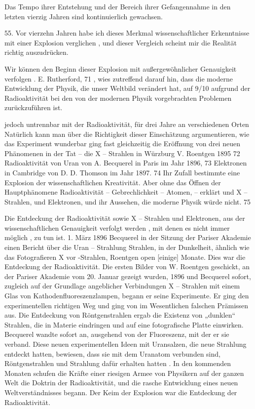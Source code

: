\documentclass[11pt,a4paper]{book}
\begin{document}
Das Tempo ihrer Entstehung und der Bereich ihrer Gefangennahme in den letzten vierzig Jahren sind kontinuierlich gewachsen.



55. Vor vierzehn Jahren habe ich dieses Merkmal wissenschaftlicher Erkenntnisse mit einer Explosion verglichen , und dieser Vergleich scheint mir die Realität richtig auszudrücken.



Wir können den Beginn dieser Explosion mit außergewöhnlicher Genauigkeit verfolgen . E. Rutherford, 71 , wies zutreffend darauf hin, dass die moderne Entwicklung der Physik, die unser Weltbild verändert hat, auf 9/10 aufgrund der Radioaktivität bei den von der modernen Physik vorgebrachten Problemen zurückzuführen ist.



jedoch untrennbar mit der Radioaktivität, für drei Jahre an verschiedenen Orten Natürlich kann man über die Richtigkeit dieser Einschätzung argumentieren, wie das Experiment wunderbar ging fast gleichzeitig die Eröffnung von drei neuen Phänomenen in der Tat -- die X -- Strahlen in Würzburg V. Roentgen 1895 72 Radioaktivität von Uran von A. Becquerel in Paris im Jahr 1896, 73 Elektronen in Cambridge von D. D. Thomson im Jahr 1897. 74 Ihr Zufall bestimmte eine Explosion der wissenschaftlichen Kreativität. Aber ohne das Öffnen der Hauptphänomene Radioaktivität -- Gebrechlichkeit -- Atomen, -- erklärt und X -- Strahlen, und Elektronen, und ihr Aussehen, die moderne Physik würde nicht. 75



Die Entdeckung der Radioaktivität sowie X -- Strahlen und Elektronen, aus der wissenschaftlichen Genauigkeit verfolgt werden , mit denen es nicht immer möglich , zu tun ist. 1. März 1896 Becquerel in der Sitzung der Pariser Akademie einen Bericht über die Uran -- Strahlung Strahlen, in der Dunkelheit, ähnlich wie das Fotografieren X vor -Strahlen, Roentgen open [einige] Monate. Dies war die Entdeckung der Radioaktivität. Die ersten Bilder von W. Roentgen geschickt, an der Pariser Akademie vom 20. Januar gezeigt wurden, 1896 und Becquerel sofort, zugleich auf der Grundlage angeblicher Verbindungen X -- Strahlen mit einem Glas von Kathodenfluoreszenzlampen, begann er seine Experimente. Er ging den experimentellen richtigen Weg und ging von im Wesentlichen falschen Prämissen aus. Die Entdeckung von Röntgenstrahlen ergab die Existenz von „dunklen“ Strahlen, die in Materie eindringen und auf eine fotografische Platte einwirken. Becquerel wandte sofort an, ausgehend von der Fluoreszenz, mit der er sie verband. Diese neuen experimentellen Ideen mit Uransalzen, die neue Strahlung entdeckt hatten, bewiesen, dass sie mit dem Uranatom verbunden sind, Röntgenstrahlen und Strahlung dafür erhalten hatten . In den kommenden Monaten schufen die Kräfte einer riesigen Armee von Physikern auf der ganzen Welt die Doktrin der Radioaktivität, und die rasche Entwicklung eines neuen Weltverständnisses begann. Der Keim der Explosion war die Entdeckung der Radioaktivität.
\end{document}
